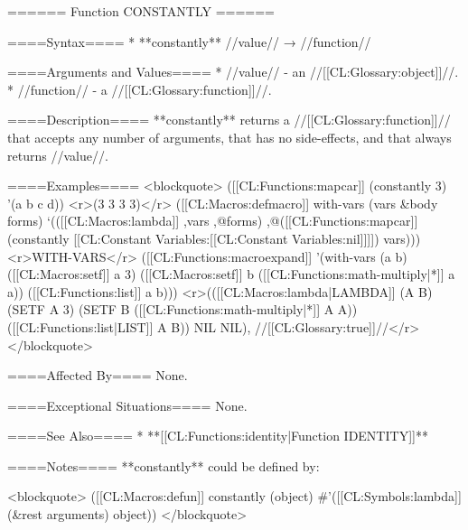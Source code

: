 ====== Function CONSTANTLY ======

====Syntax====
  * **constantly** //value// → //function//

====Arguments and Values====
  * //value// - an //[[CL:Glossary:object]]//.
  * //function// - a //[[CL:Glossary:function]]//.

====Description====
**constantly** returns a //[[CL:Glossary:function]]// that accepts any number of arguments, that has no side-effects, and that always returns //value//.

====Examples====
<blockquote>
([[CL:Functions:mapcar]] (constantly 3) '(a b c d)) <r>(3 3 3 3)</r>
([[CL:Macros:defmacro]] with-vars (vars &body forms) 
  `(([[CL:Macros:lambda]] ,vars ,@forms) ,@([[CL:Functions:mapcar]] (constantly [[CL:Constant Variables:[[CL:Constant Variables:nil]]]]) vars))) <r>WITH-VARS</r>
([[CL:Functions:macroexpand]] 
  '(with-vars (a b) 
     ([[CL:Macros:setf]] a 3) 
     ([[CL:Macros:setf]] b ([[CL:Functions:math-multiply|*]] a a))
     ([[CL:Functions:list]] a b)))
<r>(([[CL:Macros:lambda|LAMBDA]] (A B) (SETF A 3) (SETF B ([[CL:Functions:math-multiply|*]] A A)) ([[CL:Functions:list|LIST]] A B)) NIL NIL), //[[CL:Glossary:true]]//</r>
</blockquote>

====Affected By====
None.

====Exceptional Situations====
None.

====See Also====
  * **[[CL:Functions:identity|Function IDENTITY]]**

====Notes====
**constantly** could be defined by:

<blockquote> 
([[CL:Macros:defun]] constantly (object) #'([[CL:Symbols:lambda]] (&rest arguments) object))
</blockquote>

